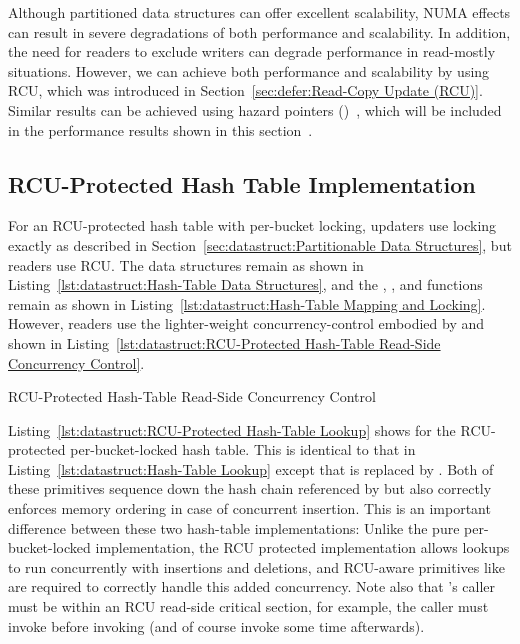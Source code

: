 Although partitioned data structures can offer excellent scalability,
NUMA effects can result in severe degradations of both performance and
scalability.
In addition,
the need for readers to exclude writers can degrade performance in
read-mostly situations.
However, we can achieve both performance and scalability by using
RCU, which was introduced in
Section~\ref{sec:defer:Read-Copy Update (RCU)}.
Similar results can be achieved using hazard pointers
()~\cite{MagedMichael04a}, which will be included in
the performance results shown in this
section~\cite{McKenney:2013:SDS:2483852.2483867}.

\subsection{RCU-Protected Hash Table Implementation}
\label{sec:datastruct:RCU-Protected Hash Table Implementation}

For an RCU-protected hash table with per-bucket locking,
updaters use locking exactly as described in
Section~\ref{sec:datastruct:Partitionable Data Structures},
but readers use RCU.
The data structures remain as shown in
Listing~\ref{lst:datastruct:Hash-Table Data Structures},
and the , , and 
functions remain as shown in
Listing~\ref{lst:datastruct:Hash-Table Mapping and Locking}.
However, readers use the lighter-weight concurrency-control embodied
by  and 
shown in
Listing~\ref{lst:datastruct:RCU-Protected Hash-Table Read-Side Concurrency Control}.

\begin{listing}[tb]

\caption{RCU-Protected Hash-Table Read-Side Concurrency Control}
\label{lst:datastruct:RCU-Protected Hash-Table Read-Side Concurrency Control}
\end{listing}

Listing~\ref{lst:datastruct:RCU-Protected Hash-Table Lookup}
shows  for the RCU-protected per-bucket-locked
hash table.
This is identical to that in
Listing~\ref{lst:datastruct:Hash-Table Lookup}
except that  is replaced
by .
Both of these primitives sequence down the hash chain referenced
by  but  also
correctly enforces memory ordering in case of concurrent insertion.
This is an important difference between these two hash-table implementations:
Unlike the pure per-bucket-locked implementation, the RCU protected
implementation allows lookups to run concurrently with insertions
and deletions, and RCU-aware primitives like
 are required to correctly handle
this added concurrency.
Note also that 's caller must be within an
RCU read-side critical section, for example, the caller must invoke
 before invoking 
(and of course invoke  some time afterwards).

